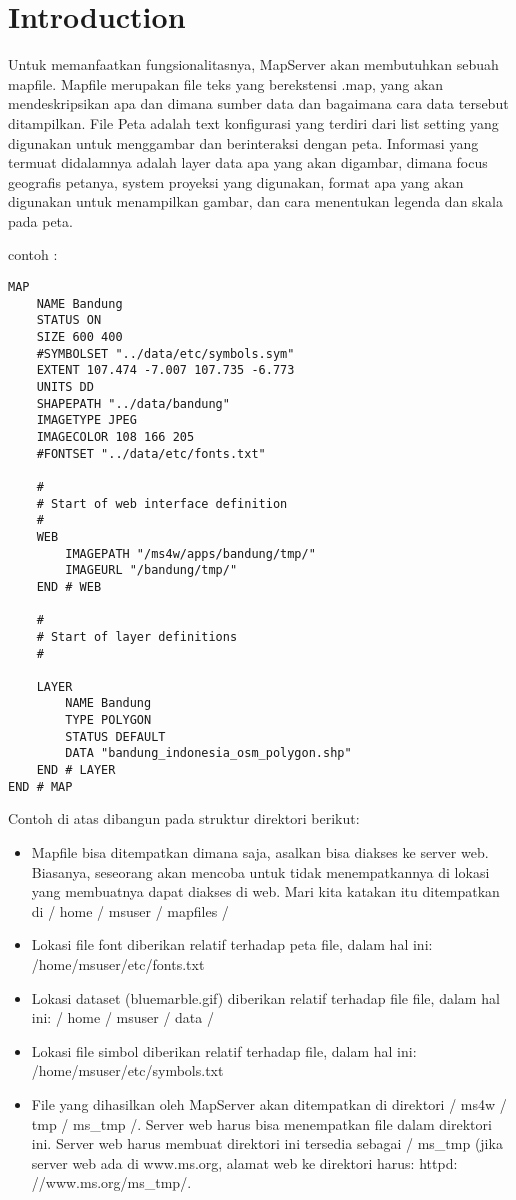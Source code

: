 

\section{Introduction}

Untuk memanfaatkan fungsionalitasnya, MapServer akan membutuhkan sebuah mapfile. Mapfile merupakan file teks yang berekstensi .map,
yang akan mendeskripsikan apa dan dimana sumber data dan bagaimana cara data tersebut ditampilkan. 
File Peta adalah text konfigurasi yang terdiri dari list setting yang digunakan untuk menggambar dan berinteraksi dengan peta. 
Informasi yang termuat didalamnya adalah layer data apa yang akan digambar, dimana focus geografis petanya, 
system proyeksi yang digunakan, format apa yang akan digunakan untuk menampilkan gambar, dan cara menentukan legenda dan skala pada peta.

contoh :
\begin{verbatim}
MAP
    NAME Bandung
    STATUS ON
    SIZE 600 400
    #SYMBOLSET "../data/etc/symbols.sym"
    EXTENT 107.474 -7.007 107.735 -6.773
    UNITS DD
    SHAPEPATH "../data/bandung"
	IMAGETYPE JPEG
    IMAGECOLOR 108 166 205
    #FONTSET "../data/etc/fonts.txt"

    #
    # Start of web interface definition
    #
    WEB
		IMAGEPATH "/ms4w/apps/bandung/tmp/" 
		IMAGEURL "/bandung/tmp/"
    END # WEB

    #
    # Start of layer definitions
    #
	
    LAYER
        NAME Bandung
        TYPE POLYGON
        STATUS DEFAULT
        DATA "bandung_indonesia_osm_polygon.shp"
    END # LAYER
END # MAP
\end{verbatim}

Contoh di atas dibangun pada struktur direktori berikut:

\begin{itemize}

\item Mapfile bisa ditempatkan dimana saja, asalkan bisa diakses ke server web. Biasanya, seseorang akan mencoba untuk tidak menempatkannya di lokasi yang membuatnya dapat diakses di web. Mari kita katakan itu ditempatkan di / home / msuser / mapfiles /
\item Lokasi file font diberikan relatif terhadap peta file, dalam hal ini: /home/msuser/etc/fonts.txt
\item Lokasi dataset (bluemarble.gif) diberikan relatif terhadap file file, dalam hal ini: / home / msuser / data /
\item Lokasi file simbol diberikan relatif terhadap file, dalam hal ini: /home/msuser/etc/symbols.txt
\item File yang dihasilkan oleh MapServer akan ditempatkan di direktori / ms4w / tmp / ms_tmp /. Server web harus bisa menempatkan file dalam direktori ini. Server web harus membuat direktori ini tersedia sebagai / ms_tmp (jika server web ada di www.ms.org, alamat web ke direktori harus: httpd: //www.ms.org/ms_tmp/.
\end{itemize}
